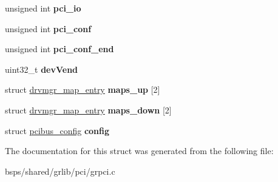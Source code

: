 \begin{DoxyCompactItemize}
\mbox{\label{structgrpci__priv_a8c9b27192c32d9fcea4020f1648feb88}} 
unsigned int {\bfseries pci\+\_\+io}
\item 
\mbox{\label{structgrpci__priv_ac7f73ba51199a918cb23010a35307970}} 
unsigned int {\bfseries pci\+\_\+conf}
\item 
\mbox{\label{structgrpci__priv_af695f9445c334e50ad02b53955585d6b}} 
unsigned int {\bfseries pci\+\_\+conf\+\_\+end}
\item 
\mbox{\label{structgrpci__priv_aa1940b585d887c562bab7aacfdb783dc}} 
uint32\+\_\+t {\bfseries dev\+Vend}
\item 
\mbox{\label{structgrpci__priv_aa344c5ebce1a5fbd690eda5694e16807}} 
struct \mbox{\hyperlink{structdrvmgr__map__entry}{drvmgr\+\_\+map\+\_\+entry}} {\bfseries maps\+\_\+up} \mbox{[}2\mbox{]}
\item 
\mbox{\label{structgrpci__priv_aa4e9f741ced6fc16f3c467ed663d591a}} 
struct \mbox{\hyperlink{structdrvmgr__map__entry}{drvmgr\+\_\+map\+\_\+entry}} {\bfseries maps\+\_\+down} \mbox{[}2\mbox{]}
\item 
\mbox{\label{structgrpci__priv_adb41c80747fd33f1c29d6e74f77a7536}} 
struct \mbox{\hyperlink{structpcibus__config}{pcibus\+\_\+config}} {\bfseries config}
\end{DoxyCompactItemize}


The documentation for this struct was generated from the following file\+:\begin{DoxyCompactItemize}
\item 
bsps/shared/grlib/pci/grpci.\+c\end{DoxyCompactItemize}
